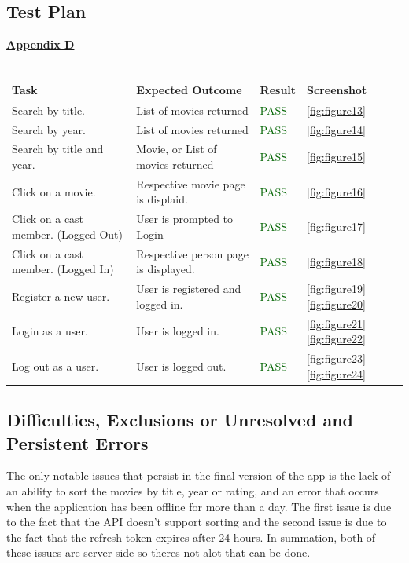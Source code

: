 \documentclass[12pt,a4paper]{article}
\begin{document}
		\subsection{Test Plan}
			\hyperref[subsec:appendixD]{\textbf{Appendix D}}\\
			\\
			\begin{tabular}{|p{}|p{}|p{}|p{}|}
				\hline
				\rowcolor{gray!30}
				\textbf{Task} & 
				\textbf{Expected Outcome} & 
				\textbf{Result} & 
				\textbf{Screenshot} \\
				\hline
				Search by title. & 
				List of movies returned & 
				\textcolor{darkgreen}{PASS} & 
				\cref{fig:figure13} \\
				\hline
				Search by year. & 
				List of movies returned & 
				\textcolor{darkgreen}{PASS} & 
				\cref{fig:figure14} \\
				\hline
				Search by title and year. &
				Movie, or List of movies returned & 
				\textcolor{darkgreen}{PASS} &
				\cref{fig:figure15} \\
				\hline
				Click on a movie. &
				Respective movie page is displaid. &
				\textcolor{darkgreen}{PASS} &
				\cref{fig:figure16} \\
				\hline
				Click on a cast member.
				(Logged Out) &
				User is prompted to Login &
				\textcolor{darkgreen}{PASS} &
				\cref{fig:figure17} \\
				\hline
				Click on a cast member.
				(Logged In) &
				Respective person page is displayed. &
				\textcolor{darkgreen}{PASS} &
				\cref{fig:figure18} \\
				\hline
				Register a new user. &
				User is registered and logged in. &
				\textcolor{darkgreen}{PASS} &
				\cref{fig:figure19} 
				\cref{fig:figure20} \\
				\hline
				Login as a user. &
				User is logged in. &
				\textcolor{darkgreen}{PASS} &
				\cref{fig:figure21}
				\cref{fig:figure22} \\
				\hline
				Log out as a user. &
				User is logged out. &
				\textcolor{darkgreen}{PASS} &
				\cref{fig:figure23} 
				\cref{fig:figure24} \\
				\hline
			\end{tabular}
	
		\subsection{Difficulties, Exclusions or Unresolved and Persistent Errors}
			The only notable issues that persist in the final version of the app is the lack of 
			an ability to sort the movies by title, year or rating, and an error that occurs when the 
			application has been offline for more than a day. The first issue is due to the fact that 
			the API doesn't support sorting and the second issue is due to the fact that the refresh 
			token expires after 24 hours. In summation, both of these issues are server side so theres 
			not alot that can be done.
	
\end{document}
